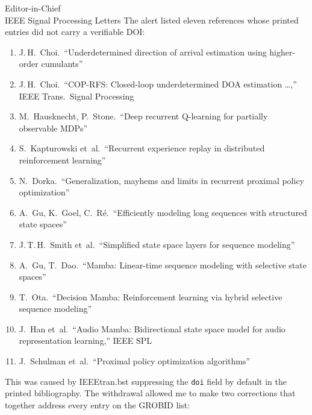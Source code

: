 \documentclass[11pt,a4paper]{letter}
\begin{document}
\begin{letter}{Editor-in-Chief\\
IEEE Signal Processing Letters}
\noindent
The alert listed eleven references whose printed entries did not carry
a verifiable DOI:

\smallskip
\begin{enumerate}\itemsep0pt\parskip0pt\small
  \item J.\,H.\ Choi.\ ``Underdetermined direction of arrival
        estimation using higher-order cumulants''
  \item J.\,H.\ Choi.\ ``COP-RFS: Closed-loop underdetermined DOA
        estimation \ldots,'' IEEE Trans.\ Signal Processing
  \item M.\ Hausknecht, P.\ Stone.\ ``Deep recurrent Q-learning for
        partially observable MDPs''
  \item S.\ Kapturowski et~al.\ ``Recurrent experience replay in
        distributed reinforcement learning''
  \item N.\ Dorka.\ ``Generalization, mayhems and limits in recurrent
        proximal policy optimization''
  \item A.\ Gu, K.\ Goel, C.\ R\'e.\ ``Efficiently modeling long
        sequences with structured state spaces''
  \item J.\,T.\,H.\ Smith et~al.\ ``Simplified state space layers for
        sequence modeling''
  \item A.\ Gu, T.\ Dao.\ ``Mamba: Linear-time sequence modeling with
        selective state spaces''
  \item T.\ Ota.\ ``Decision Mamba: Reinforcement learning via hybrid
        selective sequence modeling''
  \item J.\ Han et~al.\ ``Audio Mamba: Bidirectional state space model
        for audio representation learning,'' IEEE SPL
  \item J.\ Schulman et~al.\ ``Proximal policy optimization
        algorithms''
\end{enumerate}

\smallskip
\noindent
This was caused by IEEEtran.bst suppressing the \texttt{doi} field by
default in the printed bibliography. The withdrawal allowed me to
make two corrections that together address every entry on the GROBID
list:


\end{letter}
\end{document}
